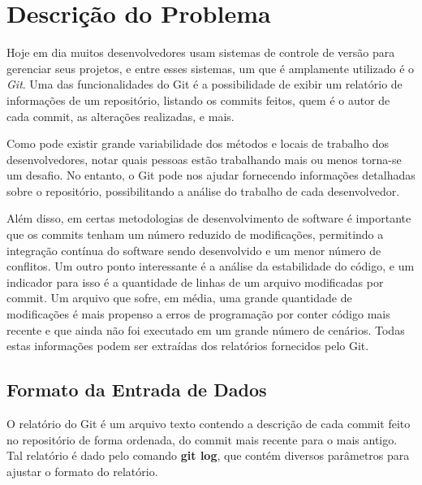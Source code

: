




\cabecalho

\section{Descrição do Problema}

Hoje em dia muitos desenvolvedores usam sistemas de controle de versão para gerenciar
seus projetos, e entre esses sistemas, um que é amplamente utilizado é o \textit{Git}.
Uma das funcionalidades do Git é a possibilidade de exibir um relatório de informações 
de um repositório, listando os commits feitos, quem é o autor de cada commit, as alterações
realizadas, e mais.

Como pode existir grande variabilidade dos métodos e locais de trabalho dos desenvolvedores,
notar quais pessoas estão trabalhando mais ou menos torna-se um desafio. No entanto, o Git
pode nos ajudar fornecendo informações detalhadas sobre o repositório, possibilitando a
análise do trabalho de cada desenvolvedor.

Além disso, em certas metodologias de desenvolvimento de software é importante que os 
commits tenham um número reduzido de modificações, permitindo a integração contínua
do software sendo desenvolvido e um menor número de conflitos. Um outro ponto interessante
é a análise da estabilidade do código, e um indicador para isso é a quantidade de linhas
de um arquivo modificadas por commit. Um arquivo que sofre, em média, uma grande quantidade
de modificações é mais propenso a erros de programação por conter código mais recente e que
ainda não foi executado em um grande número de cenários. Todas estas informações podem ser
extraídas dos relatórios fornecidos pelo Git.

\subsection{Formato da Entrada de Dados}

O relatório do Git é um arquivo texto contendo a descrição de cada commit feito no repositório
de forma ordenada, do commit mais recente para o mais antigo. Tal relatório é dado pelo comando
\textbf{git log}, que contém diversos parâmetros para ajustar o formato do relatório.

